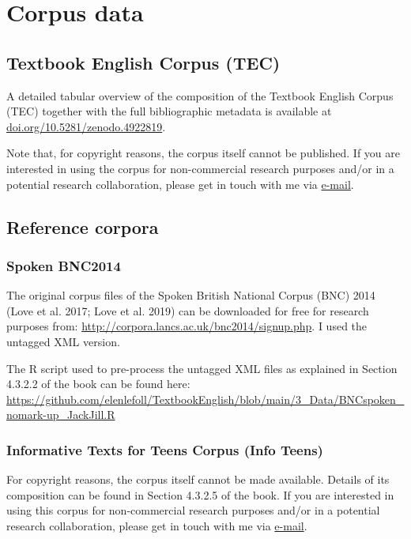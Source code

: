 \documentclass[
  letterpaper,
  DIV=11,
  numbers=noendperiod]{scrreprt}
\begin{document}

\chapter{Corpus data}\label{corpus-data}

\section{Textbook English Corpus
(TEC)}\label{textbook-english-corpus-tec}

A detailed tabular overview of the composition of the Textbook English
Corpus (TEC) together with the full bibliographic metadata is available
at
\href{https://doi.org/10.5281/zenodo.4922819}{doi.org/10.5281/zenodo.4922819}.

Note that, for copyright reasons, the corpus itself cannot be published.
If you are interested in using the corpus for non-commercial research
purposes and/or in a potential research collaboration, please get in
touch with me via \href{https://orcid.org/0000-0002-5839-8010}{e-mail}.

\section{Reference corpora}\label{reference-corpora}

\subsection{Spoken BNC2014}\label{spoken-bnc2014}

The original corpus files of the Spoken British National Corpus (BNC)
2014 (Love et al. 2017; Love et al. 2019) can be downloaded for free for
research purposes from:
\url{http://corpora.lancs.ac.uk/bnc2014/signup.php}. I used the untagged
XML version.

The R script used to pre-process the untagged XML files as explained in
Section 4.3.2.2 of the book can be found here:
\url{https://github.com/elenlefoll/TextbookEnglish/blob/main/3_Data/BNCspoken_nomark-up_JackJill.R}

\subsection{Informative Texts for Teens Corpus (Info
Teens)}\label{informative-texts-for-teens-corpus-info-teens}

For copyright reasons, the corpus itself cannot be made available.
Details of its composition can be found in Section 4.3.2.5 of the book.
If you are interested in using this corpus for non-commercial research
purposes and/or in a potential research collaboration, please get in
touch with me via \href{https://orcid.org/0000-0002-5839-8010}{e-mail}.
\end{document}
